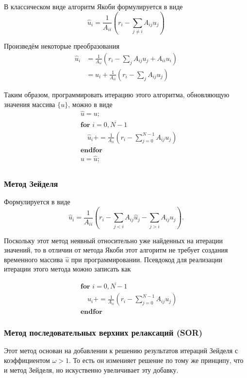 В классическом виде алгоритм Якоби формулируется в виде
\begin{equation*}
    \hat u_i = \frac{1}{A_{ii}}\left(r_i - \sum_{j\neq i} A_{ij}{u_j}\right)
\end{equation*}

Произведём некоторые преобразования
\begin{align*}
    \hat u_i &= \frac{1}{A_{ii}}\left(r_i - \sum_{j} A_{ij}{u_j} + A_{ii}u_i\right) \\
             &= u_i + \frac{1}{A_{ii}}\left(r_i - \sum_{j} A_{ij}{u_j}\right)
\end{align*}

Таким образом, программировать итерацию этого алгоритма, обновляющую значения массива $\{u\}$, можно в виде
\begin{align*}
    &\hat u = u; \\
    &\textbf{for } i=\overline{0, N-1} \\ 
    &\quad \hat u_i \mathrel{{+}{=}} \frac{1}{A_{ii}}\left(r_i - \sum_{j=0}^{N-1} A_{ij}{u_j}\right)\\
    &\textbf{endfor} \\
    & u = \hat u; \\
\end{align*}


\subsubsection{Метод Зейделя}
\label{sec:SLAE-Seidel}
Формулируется в виде
\begin{equation*}
    \hat u_i = \frac{1}{A_{ii}}\left(r_i - \sum_{j<i} A_{ij}{\hat u_j} - \sum_{j>i} A_{ij}{u_j} \right).
\end{equation*}

Поскольку этот метод неявный относительно уже найденных на итерации значений, то в отличии от метода Якоби этот алгоритм не требует создания временного массива $\hat u$
при программировании. Псевдокод для реализации итерации этого метода можно записать как

\begin{align*}
    &\textbf{for } i=\overline{0, N-1} \\ 
    &\quad u_i \mathrel{{+}{=}} \frac{1}{A_{ii}}\left(r_i - \sum_{j=0}^{N-1} A_{ij}{u_j}\right)\\
    &\textbf{endfor}
\end{align*}


\subsubsection{Метод последовательных верхних релаксаций (SOR)}
\label{sec:SLAE-SOR}
Этот метод основан на добавлении к решению результатов итераций Зейделя с
коэффициентом $\omega > 1$. То есть он изменияет решение по тому же
принципу, что и метод Зейделя, но искуственно увеличивает эту добавку.

